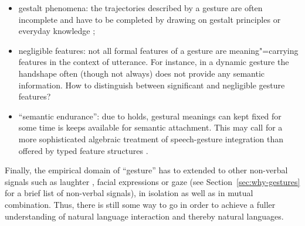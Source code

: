 \documentclass[output=paper]{langsci/langscibook}
\begin{document}
\begin{itemize}
\item gestalt phenomena: the trajectories described by a gesture are often incomplete and have to be completed by drawing on gestalt principles or everyday knowledge \citep{Luecking:2016};
\item negligible features: not all formal features of a gesture are meaning"=carrying features in the context of utterance. For instance, in a dynamic gesture the handshape often (though not always) does not provide any semantic information. How to distinguish between significant and negligible gesture features?
\item \enquote{semantic endurance}: due to holds, gestural meanings can kept fixed for some time is keeps available for semantic attachment. This may call for a more sophisticated algebraic treatment of speech-gesture integration than offered by typed feature structures \citep{Rieser:2015}.
\end{itemize}

Finally, the empirical domain of \enquote{gesture} has to extended to other non-verbal signals such as laughter \citep{Ginzburg:Breitholz:Cooper:Hough:Tian:2015}, facial expressions or gaze (see Section~\ref{sec:why-gestures} for a brief list of non-verbal signals), in isolation as well as in mutual combination.
%
Thus, there is still some way to go in order to achieve a fuller understanding of natural language interaction and thereby natural languages.


 


{\sloppy
\printbibliography[heading=subbibliography,notkeyword=this]
}
\end{document}
